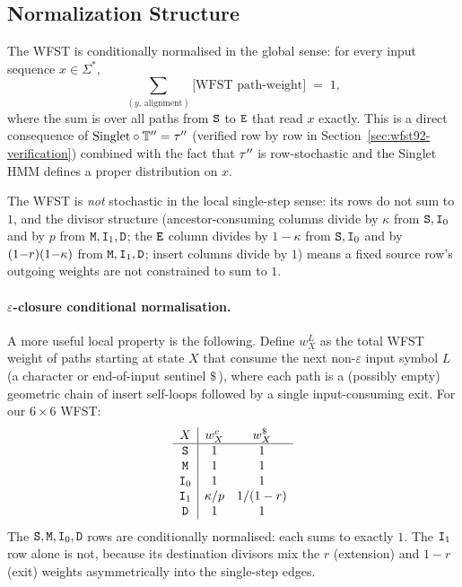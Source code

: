 \subsection{Normalization Structure}
\label{sec:wfst-row-sums}

The WFST is conditionally normalised in the global sense: for every
input sequence $x \in \Sigma^*$,
\[
\sum_{(y,\,\text{alignment})}
   \bigl[\text{WFST path-weight}\bigr]
\;=\; 1,
\]
where the sum is over all paths from ${\tt S}$ to ${\tt E}$ that read $x$
exactly.  This is a direct consequence of
$\text{Singlet} \circ \mathbb{T}'' = \tau''$ (verified row by row
in Section~\ref{sec:wfst92-verification}) combined with the fact that
$\tau''$ is row-stochastic and the Singlet HMM defines a proper
distribution on $x$.

The WFST is \emph{not} stochastic in the local single-step sense:
its rows do not sum to $1$, and the divisor structure
(ancestor-consuming columns divide by $\kappa$ from ${\tt S},{\tt I}_0$ and
by $p$ from ${\tt M},{\tt I}_1,{\tt D}$; the ${\tt E}$ column divides by $1{-}\kappa$
from ${\tt S},{\tt I}_0$ and by $(1{-}r)(1{-}\kappa)$ from
${\tt M},{\tt I}_1,{\tt D}$; insert columns divide by $1$) means a fixed source
row's outgoing weights are not constrained to sum to $1$.

\paragraph{$\varepsilon$-closure conditional normalisation.}
A more useful local property is the following.  Define
$w_X^L$ as the total WFST weight of paths starting at state $X$
that consume the next non-$\varepsilon$ input symbol $L$ (a character or
end-of-input sentinel $\$\,$), where each path is a (possibly empty)
geometric chain of insert self-loops followed by a single
input-consuming exit.  For our $6{\times}6$ WFST:
\begin{equation}
\begin{array}{c|cc}
X & w_X^c & w_X^\$ \\\hline
{\tt S}   & 1 & 1 \\
{\tt M}   & 1 & 1 \\
{\tt I}_0 & 1 & 1 \\
{\tt I}_1 & \kappa/p & 1/(1-r) \\
{\tt D}   & 1 & 1
\end{array}
\label{eq:wfst-eps-closure-table}
\end{equation}
The ${\tt S},{\tt M},{\tt I}_0,{\tt D}$ rows are conditionally normalised: each
sums to exactly $1$.  The ${\tt I}_1$ row alone is not, because its
destination divisors mix the $r$ (extension) and $1{-}r$ (exit) weights
asymmetrically into the single-step edges.

